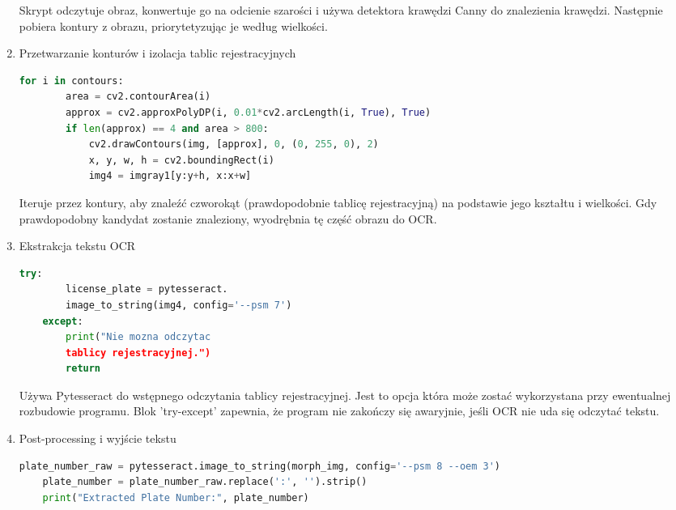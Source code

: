 \documentclass[12pt,a4paper,oneside]{article}
\theoremstyle{definition}
\numberwithin{equation}{section}
\begin{document}
\begin{enumerate}
Skrypt odczytuje obraz, konwertuje go na odcienie szarości i używa detektora krawędzi Canny do znalezienia krawędzi. Następnie pobiera kontury z obrazu, priorytetyzując je według wielkości.

\item Przetwarzanie konturów i izolacja tablic rejestracyjnych

\begin{adjustbox}{max width=\textwidth}
\begin{lstlisting}[language=Python]
    for i in contours:
        area = cv2.contourArea(i)
        approx = cv2.approxPolyDP(i, 0.01*cv2.arcLength(i, True), True)
        if len(approx) == 4 and area > 800:
            cv2.drawContours(img, [approx], 0, (0, 255, 0), 2)
            x, y, w, h = cv2.boundingRect(i)
            img4 = imgray1[y:y+h, x:x+w]
\end{lstlisting}    
\end{adjustbox}

Iteruje przez kontury, aby znaleźć czworokąt (prawdopodobnie tablicę rejestracyjną) na podstawie jego kształtu i wielkości. Gdy prawdopodobny kandydat zostanie znaleziony, wyodrębnia tę część obrazu do OCR.

\item Ekstrakcja tekstu OCR

\begin{adjustbox}{max width=\textwidth}
\begin{lstlisting}[language=Python]
    try:
        license_plate = pytesseract.
        image_to_string(img4, config='--psm 7')
    except:
        print("Nie mozna odczytac 
        tablicy rejestracyjnej.")
        return
\end{lstlisting} 
\end{adjustbox}



Używa Pytesseract do wstępnego odczytania tablicy rejestracyjnej. Jest to opcja która może zostać wykorzystana przy ewentualnej rozbudowie programu. Blok 'try-except' zapewnia, że program nie zakończy się awaryjnie, jeśli OCR nie uda się odczytać tekstu.

\item Post-processing i wyjście tekstu

\begin{adjustbox}{max width=\textwidth}
\begin{lstlisting}[language=Python]
    plate_number_raw = pytesseract.image_to_string(morph_img, config='--psm 8 --oem 3')
    plate_number = plate_number_raw.replace(':', '').strip()
    print("Extracted Plate Number:", plate_number)
\end{lstlisting} 
\end{adjustbox}



\end{enumerate}
\end{document}
